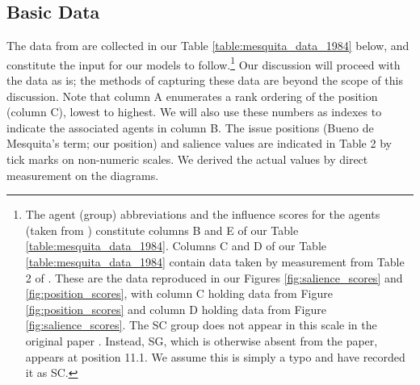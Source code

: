 \subsection{Basic Data}


The  data from \cite{mesquita_1984}  are collected in our Table \ref{table:mesquita_data_1984} below, and  constitute the  input for our models to follow.\footnote{The agent (group) abbreviations and the   {influence} scores for the agents (taken from \cite[Table 1]{mesquita_1984}) constitute columns B and E of our Table \ref{table:mesquita_data_1984}.
Columns C and D  of our Table \ref{table:mesquita_data_1984} contain data taken by measurement from Table 2 of \cite{mesquita_1984}. These are the data reproduced in our Figures \ref{fig:salience_scores} and \ref{fig:position_scores}, with column C holding data from Figure \ref{fig:position_scores} and column D holding data from Figure \ref{fig:salience_scores}.
The SC group does not appear in this scale in the original paper \cite[Table 2]{mesquita_1984}. Instead, SG, which is otherwise absent from the paper, appears at   {position} 11.1. We assume this is simply a typo and have recorded it as SC.}  
Our discussion will proceed with the data as is; the methods of capturing these data are beyond the scope of this discussion. Note that column A enumerates a rank ordering of the   {position} (column C), lowest to highest. We will also use these numbers as indexes to indicate the associated agents in column B.
 The 
 issue positions (Bueno de Mesquita's term; our   {position}) and    {salience} values are indicated in \cite{mesquita_1984} Table 2 by tick marks on non-numeric scales. We derived the actual values by direct measurement on the diagrams.
